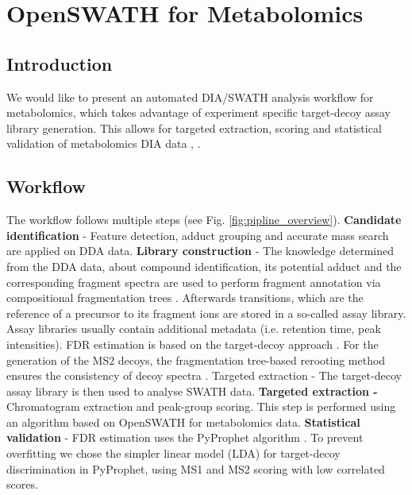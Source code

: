 \section{OpenSWATH for Metabolomics}
\subsection{Introduction}
We would like to present an automated DIA/SWATH analysis workflow for metabolomics, which takes advantage of experiment specific target-decoy assay library generation. This allows for targeted extraction, scoring and statistical validation of metabolomics DIA data \cite{Rost2014}, \cite{Teleman2015}. 

\subsection{Workflow}

The workflow follows multiple steps (see Fig. \ref{fig:pipline_overview}). \textbf{Candidate identification} - Feature detection, adduct grouping and accurate mass search are applied on DDA data. \textbf{Library construction} - The knowledge determined from the DDA data, about  compound identification, its potential adduct and the corresponding fragment spectra are used to perform fragment annotation via compositional fragmentation trees \cite{Duhrkop2019}. Afterwards transitions, which are the reference of a precursor to its fragment ions are stored in a so-called assay library. Assay libraries usually contain additional metadata (i.e. retention time, peak intensities). FDR estimation is based on the target-decoy approach \cite{Elias2007}. For the generation of the MS2 decoys, the fragmentation tree-based rerooting method ensures the consistency of decoy spectra \cite{Scheubert2017}. Targeted extraction - The target-decoy assay library is then used to analyse SWATH data. \textbf{Targeted extraction -} Chromatogram extraction and peak-group scoring. This step is performed using an algorithm based on OpenSWATH \cite{Rost2014} for metabolomics data. \textbf{Statistical validation} - FDR estimation uses the PyProphet algorithm \cite{Teleman2015}. To prevent overfitting we chose the simpler linear model (LDA) for target-decoy discrimination in PyProphet, using MS1 and MS2 scoring with low correlated scores.

